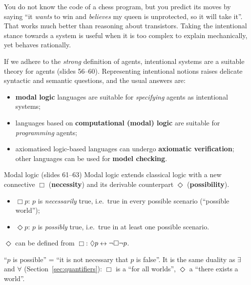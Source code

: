 \begin{nbintuition}
You do not know the code of a chess program, but you predict its moves by saying ``it
\emph{wants} to win and \emph{believes} my queen is unprotected, so it will take it''. That
works much better than reasoning about transistors. Taking the intentional stance towards a
system is useful when it is too complex to explain mechanically, yet behaves rationally.
\end{nbintuition}

If we adhere to the \emph{strong} definition of agents, intentional systems are a suitable
theory for agents (slides 56--60). Representing intentional notions raises delicate
syntactic and semantic questions, and the usual answers are:
\begin{itemize}[nosep]
  \item \textbf{modal logic} languages are suitable for \emph{specifying} agents as
        intentional systems;
  \item languages based on \textbf{computational (modal) logic} are suitable for
        \emph{programming} agents;
  \item axiomatised logic-based languages can undergo \textbf{axiomatic verification};
        other languages can be used for \textbf{model checking}.
\end{itemize}

\begin{nbdef}{Modal logic (slides 61--63)}
Modal logic extends classical logic with a new connective $\Box$ (\textbf{necessity}) and
its derivable counterpart $\Diamond$ (\textbf{possibility}).
\begin{itemize}[nosep]
  \item $\Box p$: $p$ is \emph{necessarily} true, i.e.\ true in every possible scenario
        (``possible world'');
  \item $\Diamond p$: $p$ is \emph{possibly} true, i.e.\ true in at least one possible
        scenario.
\end{itemize}
$\Diamond$ can be defined from $\Box$: \quad $\Diamond p \leftrightarrow \neg\Box\neg p$.
\end{nbdef}

``$p$ is possible'' = ``it is not necessary that $p$ is false''. It is the same duality as
$\exists$ and $\forall$ (Section~\ref{sec:quantifiers}): $\Box$ is a ``for all worlds'',
$\Diamond$ a ``there exists a world''.

